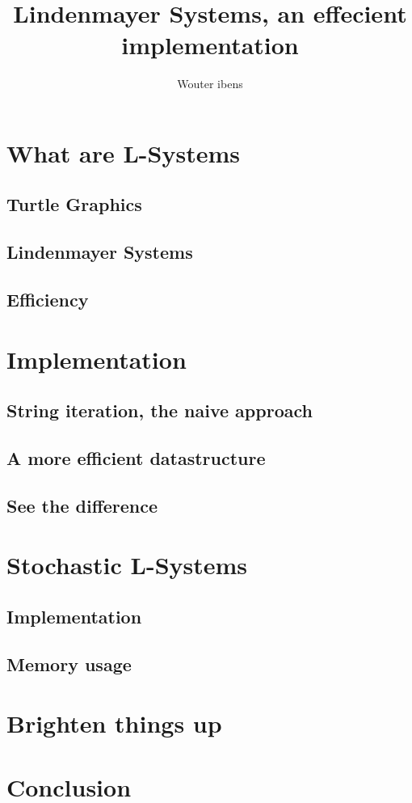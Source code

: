 \documentclass[11pt,a4paper]{article}
\author{Wouter ibens}
\title{Lindenmayer Systems, an effecient implementation}
\begin{document}
\maketitle
\tableofcontents
\section{What are L-Systems}
\subsection{Turtle Graphics}
\subsection{Lindenmayer Systems}
\subsection{Efficiency} %

\section{Implementation}
\subsection{String iteration, the naive approach}
\subsection{A more efficient datastructure} %
\subsection{See the difference} %

\section{Stochastic L-Systems} %
\subsection{Implementation}
\subsection{Memory usage}

\section{Brighten things up} %

\section{Conclusion}

\begin{appendix}

\listoffigures
\end{appendix}
\end{document}
